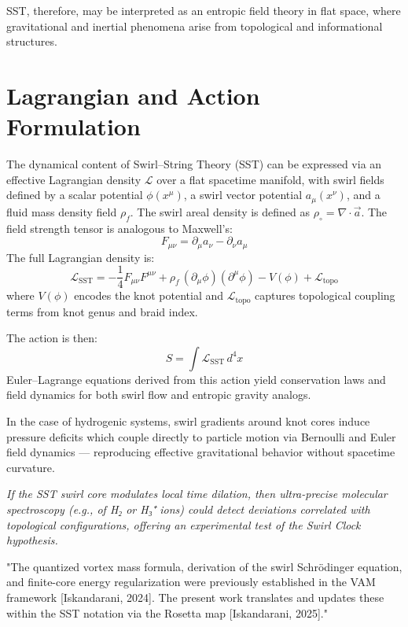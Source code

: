 \documentclass[reprint,aps,onecolumn,nofootinbib]{revtex4-2}
\begin{document}
        SST, therefore, may be interpreted as an entropic field theory in flat space, where gravitational and inertial phenomena arise from topological and informational structures.

    \section{Lagrangian and Action Formulation}

        The dynamical content of Swirl–String Theory (SST) can be expressed via an effective Lagrangian density \( \mathcal{L} \) over a flat spacetime manifold, with swirl fields defined by a scalar potential \( \phi(x^\mu) \), a swirl vector potential \( a_\mu(x^\nu) \), and a fluid mass density field \( \rho_f \). The swirl areal density is defined as \( \rho_\circ = \nabla \cdot \vec{a} \). The field strength tensor is analogous to Maxwell's:
        \[
            F_{\mu\nu} = \partial_\mu a_\nu - \partial_\nu a_\mu
        \]
        The full Lagrangian density is:
        \[
            \mathcal{L}_{\text{SST}} = -\frac{1}{4} F_{\mu\nu} F^{\mu\nu} + \rho_f \, (\partial_\mu \phi)(\partial^\mu \phi) - V(\phi) + \mathcal{L}_\text{topo}
        \]
        where \( V(\phi) \) encodes the knot potential and \( \mathcal{L}_\text{topo} \) captures topological coupling terms from knot genus and braid index.

        The action is then:
        \[
            S = \int \mathcal{L}_{\text{SST}} \, d^4x
        \]
        Euler–Lagrange equations derived from this action yield conservation laws and field dynamics for both swirl flow and entropic gravity analogs.

        In the case of hydrogenic systems, swirl gradients around knot cores induce pressure deficits which couple directly to particle motion via Bernoulli and Euler field dynamics — reproducing effective gravitational behavior without spacetime curvature.


    \emph{If the SST swirl core modulates local time dilation, then ultra-precise molecular spectroscopy (e.g., of H₂ or H₃⁺ ions) could detect deviations correlated with topological configurations, offering an experimental test of the Swirl Clock hypothesis.}


        "The quantized vortex mass formula, derivation of the swirl Schrödinger equation, and finite-core energy regularization were previously established in the VAM framework [Iskandarani, 2024]. The present work translates and updates these within the SST notation via the Rosetta map [Iskandarani, 2025]."
\end{document}
